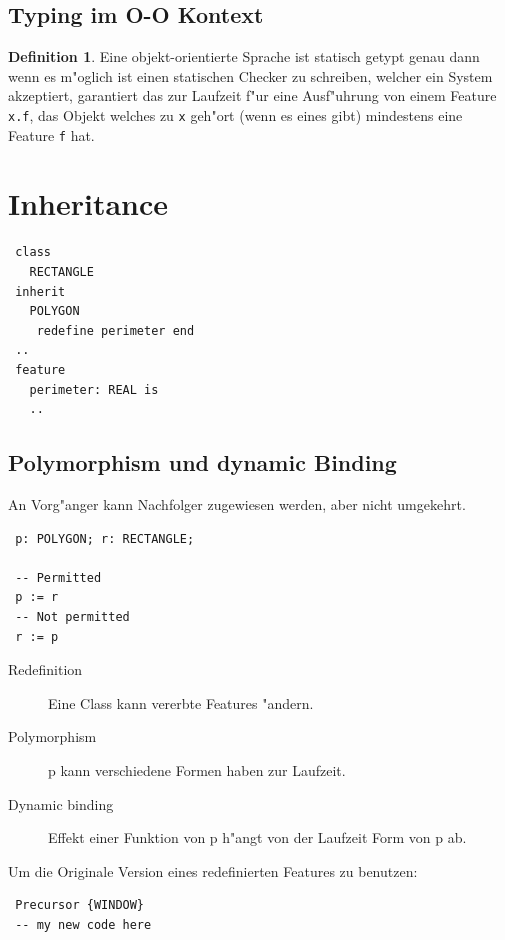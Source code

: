 \documentclass[german, 10pt, a4paper, twocolumn]{scrartcl}
\theoremstyle{definition}
\newtheorem*{definition}{Definition}
\begin{document}
\subsection{Typing im O-O Kontext}

\begin{definition}
	Eine objekt-orientierte Sprache ist statisch getypt genau dann wenn es m"oglich ist einen statischen Checker zu schreiben, welcher ein System akzeptiert, garantiert das zur Laufzeit f"ur eine Ausf"uhrung von einem Feature \verb#x.f#, das Objekt welches zu \verb#x# geh"ort (wenn es eines gibt) mindestens eine Feature \verb#f# hat.
\end{definition}

\section{Inheritance}

\begin{verbatim}
 class
   RECTANGLE
 inherit
   POLYGON
    redefine perimeter end
 ..
 feature
   perimeter: REAL is
   ..
\end{verbatim}

\subsection{Polymorphism und dynamic Binding}

An Vorg"anger kann Nachfolger zugewiesen werden, aber nicht umgekehrt.

\begin{verbatim}
 p: POLYGON; r: RECTANGLE;

 -- Permitted
 p := r
 -- Not permitted
 r := p
\end{verbatim}

\begin{description}
	\item[Redefinition] Eine Class kann vererbte Features "andern.
	\item[Polymorphism] p kann verschiedene Formen haben zur Laufzeit.
	\item[Dynamic binding] Effekt einer Funktion von p h"angt von der Laufzeit Form von p ab.
\end{description}

Um die Originale Version eines redefinierten Features zu benutzen:
\begin{verbatim}
 Precursor {WINDOW}
 -- my new code here
\end{verbatim}
\end{document}
